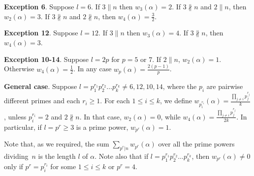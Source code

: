 \documentclass[ALCO,published]{cedram}
\begin{document}
\noindent \textbf{Exception 6}. Suppose $l=6$. If $3\parallel n$ then $w_3(\alpha)=2$. If $3\nparallel n$ and $2\parallel n$, then $w_{2}(\alpha)=3$. If $3\nparallel n$ and $2\nparallel n$, then $w_4(\alpha)=\frac{3}{2}$.

\noindent \textbf{Exception 12}. Suppose $l=12$. If $3\parallel n$ then $w_3(\alpha)=4$. If $3\nparallel n$, then $w_{4}(\alpha)=3$.

\noindent \textbf{Exception 10-14}. Suppose $l=2p$ for $p=5$ or $7$. If $2\parallel n$, $w_2(\alpha)=1$. Otherwise $w_4(\alpha)=\frac{1}{2}$. In any case $w_p(\alpha)=\frac{2(p-1)}{p}$.

\noindent \textbf{General case}. Suppose  $l=p_1^{r_1}p_2^{r_2}\ldots p_k^{r_k}\neq 6,12,10,14$, where the $p_i$ are pairwise different primes and each $r_i\ge 1$. For each $1\le i\le k$, we define $w_{p_i^{r_i}}(\alpha)=\frac{\prod\limits_{j\neq i} p_j^{r_j}}{k}$, unless $p_i^{r_i}=2$ and $2\nparallel n$. In that case, $w_2(\alpha)=0$, while $w_4(\alpha)=\frac{\prod\limits_{j\neq i} p_j^{r_j}}{2k}$. In particular, if $l=p^r\ge 3$ is a prime power, $w_{p^r}(\alpha)=1$.

Note that, as we required, the sum $\sum\limits_{p^r|n} w_{p^r}(\alpha)$ over all the prime powers dividing~$n$ is the length $l$ of $\alpha$. Note also that if $l=p_1^{r_1}p_2^{r_2}\ldots p_k^{r_k}$, then $w_{p^r}(\alpha)\neq 0$ only if $p^r=p_i^{r_i}$ for some $1\le i\le k$ or $p^r=4$. 
\end{document}
